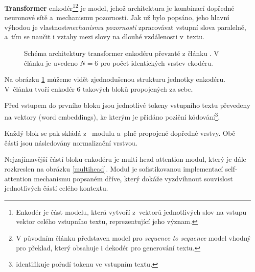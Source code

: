 \textbf{Transformer} enkodér\footnote{Enkodér je část modelu, která vytvoří z~vektorů jednotlivých slov na vstupu vektor celého vstupního textu, reprezentující jeho význam.}\footnote{V původním článku představen model pro \emph{sequence to sequence} model vhodný pro překlad, který obsahuje i dekodér pro generování textu.} je model, jehož architektura je kombinací dopředné neuronové sítě a~mechanismu pozornosti. Jak už bylo popsáno, jeho hlavní výhodou je vlastnost\linebreak \emph{mechanismu pozornosti} zpracovávat vstupní slova paralelně, a~tím se naučit i vztahy mezi slovy na dlouhé vzdálenosti v~textu.\par

\begin{figure}[hbt]
    \centering
	\caption{Schéma architektury transformer enkodéru převzaté z článku \cite{Transformers}. V článku je uvedeno $N=6$ pro počet identických vrstev ekodéru. }
	\label{transformer_encoder}
\end{figure}

Na obrázku \ref{transformer_encoder} můžeme vidět zjednodušenou strukturu jednotky enkodéru. V~článku \cite{Transformers} tvoří enkodér 6 takových bloků propojených za sebe.\par
Před vstupem do prvního bloku jsou jednotlivé tokeny vstupního textu převedeny na vektory (word embeddings), ke kterým je přidáno poziční kódování\footnote{identifikuje pořadí tokenu ve vstupním textu.}.\par
Každý blok se pak skládá z~ modulu a~plně propojené dopředné vrstvy. Obě části jsou následovány normalizační vrstvou.\par
Nejzajímavější částí bloku enkodéru je multi-head attention modul, který je dále rozkreslen na obrázku \ref{multihead}. Modul je sofistikovanou implementací self-attention mechanismu popsaném dříve, který dokáže vyzdvihnout souvislost jednotlivých částí celého kontextu. 

